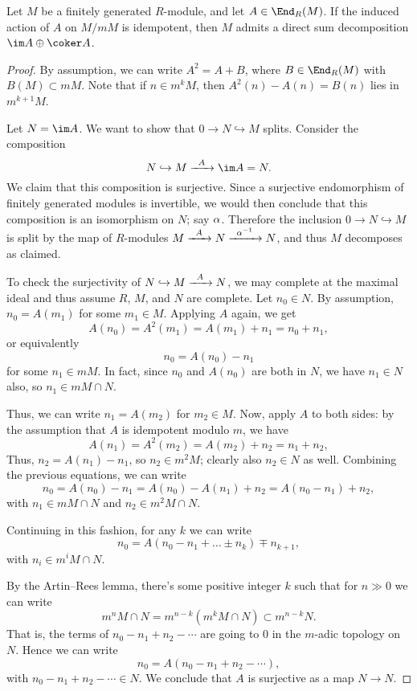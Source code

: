 \documentclass[12pt]{article}
\let\inc\hookrightarrow
\numberwithin{equation}{section}
\theoremstyle{theorem}
\numberwithin{thm}{section}
\theoremstyle{definition}
\begin{document}
\begin{lem}\label{lem:idemp}
  Let $M$ be a finitely generated $R$-module, and let $A\in\End_R(M)$. If the induced action of $A$ on $M/mM$ is idempotent, then $M$ admits a direct sum decomposition $\im A \oplus \coker A$.
\end{lem}
\begin{proof}
  By assumption, we can write $A^2 = A + B$, where $B\in\End_R(M)$ with $B(M)\subset mM$.
  Note that if $n \in m^kM$, then $A^2(n) - A(n) = B(n)$ lies in $m^{k+1}M$.

  Let $N = \im A$. We want to show that $0 \to N\inc M$ splits. Consider the composition
  \[ N\inc M \xra{A} \im A = N.\]
  We claim that this composition is surjective. Since a surjective endomorphism of finitely generated modules is invertible, we would then conclude that this composition is an isomorphism on $N$; say $\alpha$.
  Therefore the inclusion \( 0 \to N \inc M \) is split by the map of $R$-modules $M\xra{A} N\xra{\a\inv} N$, and thus $M$ decomposes as claimed.

  To check the surjectivity of $N\inc M \xra{A} N$,  we may complete at the maximal ideal and thus assume $R$, $M$, and $N$ are complete. Let $n_0\in N$. By assumption, $n_0=A(m_1)$ for some $m_1\in M$. Applying $A$ again, we get
  \[ A(n_0) = A^2(m_1) = A(m_1) + n_1 = n_0 + n_1, \]
  or equivalently
  \[ n_0 = A(n_0) - n_1 \]
  for some $n_1\in mM$. In fact, since $n_0$ and $A(n_0)$ are both in $N$, we have $n_1\in N$ also, so $n_1\in mM\cap N$.

  Thus, we can write $n_1 = A(m_2)$ for $m_2\in M$.
  Now, apply $A$ to both sides: by the assumption that $A$ is idempotent modulo $m$, we have
  \[ A(n_1)=A^2(m_2) = A(m_2) + n_2 = n_1+n_2, \]
  Thus, $n_2=A(n_1)-n_1$, so $n_2\in m^2M$; clearly also $n_2\in N$ as well.
  Combining the previous equations, we can write
  \[ n_0 = A(n_0) - n_1 = A(n_0) - A(n_1) + n_2 = A(n_0 - n_1) + n_2, \]
  with $n_1\in mM\cap N$ and $n_2\in m^2M\cap N$.

  Continuing in this fashion, for any $k$ we can write
  \[ n_0=A(n_0-n_1+\dots \pm n_k) \mp n_{k+1}, \]
  with $n_i \in m^i M\cap N$.

  By the Artin--Rees lemma, there's some positive integer $k$ such that for $n\gg0$ we can write
  \[ m^n M\cap N = m^{n-k} ( m^kM\cap N)\subset m^{n-k} N. \]
  That is, the terms of $n_0-n_1+n_2-\cdots$ are going to 0 in the $m$-adic topology on $N$. Hence we can write
  \[ n_0=A(n_0-n_1+n_2-\cdots), \]
  with $n_0-n_1+n_2-\cdots\in N$. We conclude that $A$ is surjective as a map $N\to N$.
\end{proof}
\end{document}
